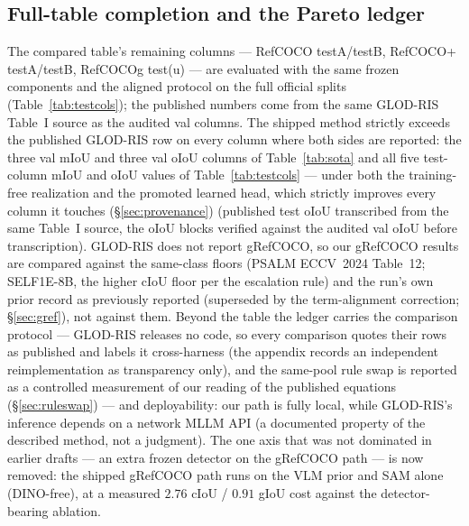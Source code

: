 \subsection{Full-table completion and the Pareto ledger}
\label{sec:testcols}
The compared table's remaining columns --- RefCOCO testA/testB, RefCOCO+
testA/testB, RefCOCOg test(u) --- are evaluated with the same frozen
components and the aligned protocol on the full official splits
(Table~\ref{tab:testcols}); the published numbers come from the same
GLOD-RIS Table~I source as the audited val columns. The shipped method strictly exceeds the
published GLOD-RIS row on every column where both sides are reported: the
three val mIoU and three val oIoU columns of Table~\ref{tab:sota} and all
five test-column mIoU and oIoU values of Table~\ref{tab:testcols} --- under
both the training-free realization and the promoted learned head, which
strictly improves every column it touches (\S\ref{sec:provenance}) (published
test oIoU transcribed from the same Table~I source, the oIoU blocks verified
against the audited val oIoU before transcription). GLOD-RIS does not report
gRefCOCO, so our gRefCOCO results are compared against the same-class floors
(PSALM ECCV~2024 Table~12; SELF1E-8B, the higher cIoU floor per the escalation
rule) and the run's own prior record as previously reported (superseded by the term-alignment correction; \S\ref{sec:gref}), not against them.
Beyond the table the ledger carries the comparison protocol --- GLOD-RIS
releases no code, so every comparison quotes their rows as published and
labels it cross-harness (the appendix records an independent
reimplementation as transparency only), and the same-pool rule swap is
reported as a controlled measurement of our reading of the published
equations (\S\ref{sec:ruleswap}) --- and deployability: our
path is fully local, while GLOD-RIS's inference depends on a network MLLM API
(a documented property of the described method, not a judgment). The one axis that was not dominated in earlier drafts --- an extra frozen
detector on the gRefCOCO path --- is now removed: the shipped gRefCOCO path
runs on the VLM prior and SAM alone (DINO-free), at a measured $2.76$ cIoU /
$0.91$ gIoU cost against the detector-bearing ablation.

\begin{table}[t]\centering\small
\caption{Test-column completion (mIoU; oIoU in the same JSON,
\texttt{test\_columns.json}): full official splits, same frozen components,
aligned protocol; published from GLOD-RIS Table~I test columns.}
\label{tab:testcols}

\end{table}

